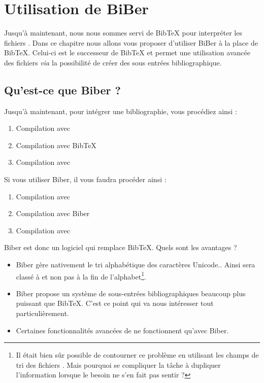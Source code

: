 \chapter{Utilisation de BiBer}\label{biber}

\begin{prealable}
Jusqu'à maintenant, nous nous sommes servi de BibTeX pour interpréter les fichiers . Dans ce chapitre nous allons vous proposer d'utiliser BiBer à la place de BibTeX. Celui-ci est le successeur de BibTeX et permet une utilisation avancée des fichiers  \emph{via} la possibilité de créer des sous entrées bibliographique.
\end{prealable}

\section{Qu'est-ce que Biber ?}

Jusqu'à maintenant, pour intégrer une bibliographie, vous procédiez ainsi :
\begin{enumerate}
\item Compilation avec \XeLaTeX
\item Compilation avec BibTeX
\item Compilation avec \XeLaTeX
\end{enumerate}

Si vous utiliser Biber, il vous faudra procéder ainsi :

\begin{enumerate}
\item Compilation avec \XeLaTeX
\item Compilation avec Biber
\item Compilation avec \XeLaTeX
\end{enumerate}

Biber est donc un logiciel qui remplace BibTeX. Quels sont les avantages ?

\begin{itemize}
\item Biber gère nativement le tri alphabétique des caractères Unicode.. Ainsi  sera classé à  et non pas à la fin de l'alphabet\footnote{Il était bien sûr possible de contourner ce problème en utilisant les champs de tri des fichiers . Mais pourquoi se compliquer la tâche à dupliquer l'information lorsque le besoin ne s'en fait pas sentir ?}.
\item Biber propose un système de sous-entrées bibliographiques beaucoup plus puissant que BibTeX. C'est ce point qui va nous intéresser tout particulièrement.
\item Certaines fonctionnalités avancées de  ne fonctionnent qu'avec Biber.
\end{itemize}

